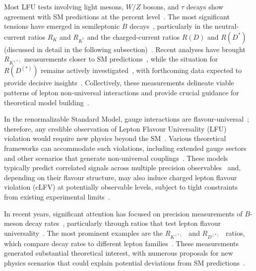 Most LFU tests involving light mesons, $W/Z$ bosons, and $\tau$ decays show agreement with SM predictions at the percent level~\parencite{1674-1137-40-10-100001}. The most significant tensions have emerged in semileptonic $B$ decays~\cite{Hiller:2014yaa,Buttazzo:2017ixm,Capdevila_2018,Alonso:2015sja,Calibbi:2015kma}, particularly in the neutral-current ratios $R_K$ and $R_{K^*}$ and the charged-current ratios $R(D)$ and $R(D^*)$ (discussed in detail in the following subsection)~\cite{Altmannshofer_2015,Capdevila_2018}. Recent analyses have brought $R_{K^{(*)}}$ measurements closer to SM predictions~\parencite{LHCb:2022qnv,LHCb:2022zom,Greljo:2022jac,Ciuchini:2022wbq}, while the situation for $R(D^{(*)})$ remains actively investigated~\cite{Amhis_2021}, with forthcoming data expected to provide decisive insights~\cite{Belle-II:2018jsg}. Collectively, these measurements delineate viable patterns of lepton non-universal interactions and provide crucial guidance for theoretical model building~\cite{Dorsner:2016wpm,Buttazzo:2017ixm,Angelescu:2018tyl,Cornella:2021sby}.

In the renormalizable Standard Model, gauge interactions are flavour-universal~\cite{gl1961579,PhysRevLett.19.1264,1674-1137-40-10-100001}; therefore, any credible observation of Lepton Flavour Universality (LFU) violation would require new physics beyond the SM~\cite{Hiller:2014yaa,Dorsner:2016wpm}. Various theoretical frameworks can accommodate such violations, including extended gauge sectors and other scenarios that generate non-universal couplings~\cite{DiLuzio:2017vat,Greljo:2018tuh,Angelescu:2021lln}. These models typically predict correlated signals across multiple precision observables~\cite{Greljo:2022jac,Ciuchini:2022wbq,Allwicher:2022gkm} and, depending on their flavour structure, may also induce charged lepton flavour violation (cLFV) at potentially observable levels, subject to tight constraints from existing experimental limits~\parencite{Blankenburg:2012nx,Angelescu:2018tyl}.

In recent years, significant attention has focused on precision measurements of $B$-meson decay rates~\cite{Hiller:2014yaa,Buttazzo:2017ixm}, particularly through ratios that test lepton flavour universality~\cite{Amhis_2021}. The most prominent examples are the $R_{K^{(*)}}$~\parencite{LHCb:2014vgu,LHCb:2017avl,LHCb:2019hip,LHCb:2021trn} and $R_{D^{(*)}}$~\parencite{BaBar:2012obs,BaBar:2013mob,Abdesselam:2019dgh,Hirose:2017dxl,Sato:2016svk,Hirose:2016wfn,Huschle:2015rga,LHCb:2015gmp,Aaij:2015yra,Aaij:2017uff,LHCb:2017rln,LHCb:2023zxo} ratios, which compare decay rates to different lepton families~\cite{Amhis_2021,1674-1137-40-10-100001}. These measurements generated substantial theoretical interest, with numerous proposals for new physics scenarios that could explain potential deviations from SM predictions~\cite{Dorsner:2016wpm,Angelescu:2018tyl,Bauer:2015knc,Crivellin:2017zlb}.

